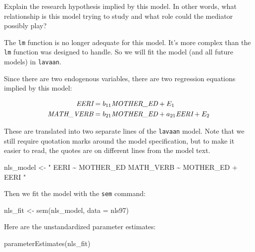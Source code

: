 \documentclass[
]{book}
\newenvironment{Shaded}{\begin{snugshade}}{\end{snugshade}}
\newcommand{\AttributeTok}[1]{\textcolor[rgb]{0.77,0.63,0.00}{#1}}
\newcommand{\FunctionTok}[1]{\textcolor[rgb]{0.00,0.00,0.00}{#1}}
\newcommand{\NormalTok}[1]{#1}
\newcommand{\OtherTok}[1]{\textcolor[rgb]{0.56,0.35,0.01}{#1}}
\newcommand{\StringTok}[1]{\textcolor[rgb]{0.31,0.60,0.02}{#1}}
\begin{document}
Explain the research hypothesis implied by this model. In other words, what relationship is this model trying to study and what role could the mediator possibly play?

The \texttt{lm} function is no longer adequate for this model. It's more complex than the \texttt{lm} function was designed to handle. So we will fit the model (and all future models) in \texttt{lavaan}.

Since there are two endogenous variables, there are two regression equations implied by this model:

\begin{align}
\textit{EERI}       &= b_{11}\textit{MOTHER\textunderscore ED} + E_{1}     \\
\textit{MATH\textunderscore VERB}  &= b_{21}\textit{MOTHER\textunderscore ED} + 
                        a_{21}\textit{EERI} + E_{2}  
\end{align}

These are translated into two separate lines of the \texttt{lavaan} model. Note that we still require quotation marks around the model specification, but to make it easier to read, the quotes are on different lines from the model text.

\begin{Shaded}
\begin{Highlighting}[]
\NormalTok{nls\_model }\OtherTok{\textless{}{-}} \StringTok{"}
\StringTok{    EERI \textasciitilde{} MOTHER\_ED}
\StringTok{    MATH\_VERB \textasciitilde{} MOTHER\_ED + EERI}
\StringTok{"}
\end{Highlighting}
\end{Shaded}

Then we fit the model with the \texttt{sem} command:

\begin{Shaded}
\begin{Highlighting}[]
\NormalTok{nls\_fit }\OtherTok{\textless{}{-}} \FunctionTok{sem}\NormalTok{(nls\_model, }\AttributeTok{data =}\NormalTok{ nls97)}
\end{Highlighting}
\end{Shaded}

Here are the unstandardized parameter estimates:

\begin{Shaded}
\begin{Highlighting}[]
\FunctionTok{parameterEstimates}\NormalTok{(nls\_fit)}
\end{Highlighting}
\end{Shaded}
\end{document}
